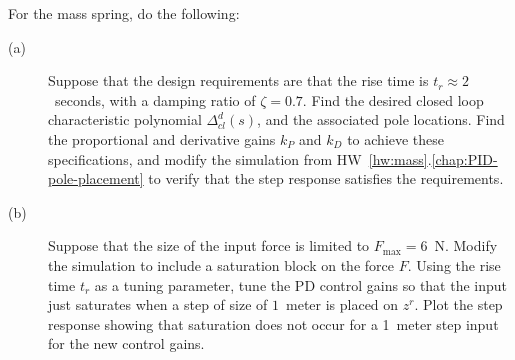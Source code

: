 For the mass spring, do the following:
\begin{description}

\item[(a)]  Suppose that the design requirements are that the rise time is
$t_r \approx 2$~seconds, with a damping ratio of $\zeta=0.7$.  Find the desired closed loop characteristic polynomial $\Delta_{cl}^d(s)$, and the associated pole locations. Find the proportional and derivative gains $k_P$ and $k_D$ to achieve these specifications, and modify the simulation from HW~\ref{hw:mass}.\ref{chap:PID-pole-placement} to verify that the step response satisfies the requirements.

\item[(b)] Suppose that the size of the input force is limited to $F_{\max}=6$~N.  Modify the simulation to include a saturation block on the force $F$.  Using the rise time $t_r$ as a tuning parameter, tune the PD control gains so that the input just saturates when a step of size of $1$~meter is placed on $z^r$. Plot the step response showing that saturation does not occur for a 1~meter step input for the new control gains.

\end{description}





